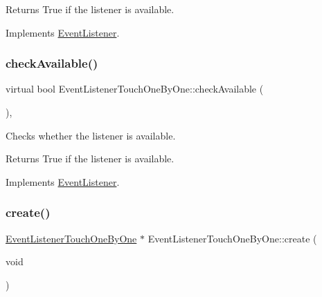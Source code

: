 \begin{DoxyReturn}{Returns}
True if the listener is available. 
\end{DoxyReturn}


Implements \hyperlink{classEventListener_adf9e4eb37ea6e94c05f4d1b6594bd35e}{Event\+Listener}.

\mbox{\label{classEventListenerTouchOneByOne_a013a626d35805cc6ca030d9f9883610b}} 
\subsubsection{\texorpdfstring{check\+Available()}{checkAvailable()}\hspace{0.1cm}{\footnotesize\ttfamily [2/2]}}
{\footnotesize\ttfamily virtual bool Event\+Listener\+Touch\+One\+By\+One\+::check\+Available (\begin{DoxyParamCaption}{ }\end{DoxyParamCaption})\hspace{0.3cm}{\ttfamily [override]}, {\ttfamily [virtual]}}

Checks whether the listener is available.

\begin{DoxyReturn}{Returns}
True if the listener is available. 
\end{DoxyReturn}


Implements \hyperlink{classEventListener_adf9e4eb37ea6e94c05f4d1b6594bd35e}{Event\+Listener}.

\mbox{\label{classEventListenerTouchOneByOne_ab0e266f8a5f242d4ea6e8cf0c170e669}} 
\subsubsection{\texorpdfstring{create()}{create()}\hspace{0.1cm}{\footnotesize\ttfamily [1/2]}}
{\footnotesize\ttfamily \hyperlink{classEventListenerTouchOneByOne}{Event\+Listener\+Touch\+One\+By\+One} $\ast$ Event\+Listener\+Touch\+One\+By\+One\+::create (\begin{DoxyParamCaption}\item[{void}]{ }\end{DoxyParamCaption})\hspace{0.3cm}{\ttfamily [static]}}

